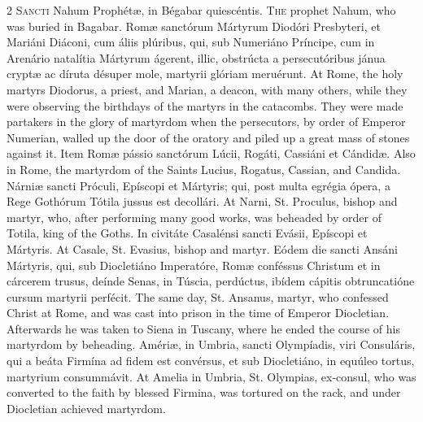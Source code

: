 \begin{paracol}{2}
\lettrine[lines=1]{S}{ancti} Nahum Prophétæ, in Bégabar quiescéntis.
\switchcolumn
{}
\lettrine[lines=1]{T}{he} prophet Nahum, who was buried in Bagabar.
\switchcolumn*
{}
Romæ sanctórum Mártyrum 
 Diodóri Presbyteri, et Mariáni Diáconi, cum áliis plúribus, qui, sub 
 Numeriáno Príncipe, cum in Arenário natalítia Mártyrum ágerent, illic, 
 obstrúcta a persecutóribus jánua cryptæ ac díruta désuper mole, martyrii 
 glóriam meruérunt.
\switchcolumn
{}
At Rome, the holy martyrs Diodorus, 
 a priest, and Marian, a deacon, with many others, while they were observing 
 the birthdays of the martyrs in the catacombs. They were made 
 partakers in the glory of martyrdom when the persecutors, by order of 
 Emperor Numerian, walled up the door of the oratory and piled up a great 
 mass of stones against it.
\switchcolumn*
{}
Item Romæ pássio 
 sanctórum Lúcii, Rogáti, Cassiáni et Cándidæ.
\switchcolumn
{}
Also in Rome, the martyrdom of the 
 Saints Lucius, Rogatus, Cassian, and Candida.
\switchcolumn*
{}
Nárniæ sancti Próculi, 
 Epíscopi et Mártyris; qui, post multa egrégia ópera, a Rege Gothórum Tótila 
 jussus est decollári.
\switchcolumn
{}
At Narni, St. Proculus, bishop and 
 martyr, who, after performing many good works, was beheaded by order of 
 Totila, king of the Goths.
\switchcolumn*
{}
In civitáte Casalénsi 
 sancti Evásii, Epíscopi et Mártyris.
\switchcolumn
{}
At Casale, St. Evasius, bishop and 
 martyr.
\switchcolumn*
{}
Eódem die sancti Ansáni 
 Mártyris, qui, sub Diocletiáno Imperatóre, Romæ conféssus Christum et in cárcerem trusus, deínde Senas, in Túscia, perdúctus, ibídem cápitis 
 obtruncatióne cursum martyrii perfécit.
\switchcolumn
{}
The same day, St. Ansanus, martyr, 
 who confessed Christ at Rome, and was cast into prison in the time of 
 Emperor Diocletian. Afterwards he was taken to Siena in Tuscany, where 
 he ended the course of his martyrdom by beheading.
\switchcolumn*
{}
Amériæ, in Umbria, 
 sancti Olympíadis, viri Consuláris, qui a beáta Firmína ad fidem est 
 convérsus, et sub Diocletiáno, in equúleo tortus, martyrium consummávit.
\switchcolumn
{}
At Amelia in Umbria, St. Olympias, 
 ex-consul, who was converted to the faith by blessed Firmina, was tortured 
 on the rack, and under Diocletian achieved martyrdom.

\end{paracol}
